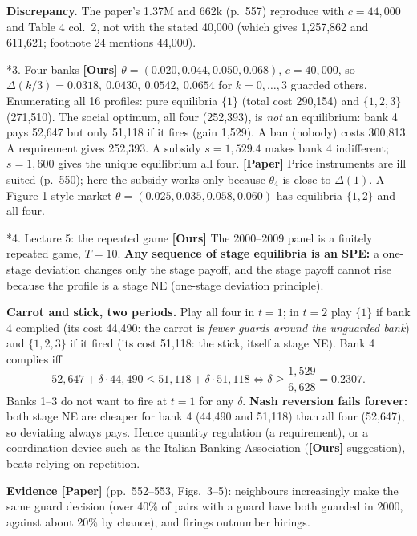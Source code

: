\documentclass[10pt,a4paper]{article}
\makeatletter
\renewcommand\section{\@startsection{section}{1}{\z@}{6pt plus 2pt}{2pt}{\normalfont\large\bfseries}}
\newcommand{\Dl}{\Delta}
\newcommand{\paper}{\textbf{[Paper]}}
\newcommand{\ours}{\textbf{[Ours]}}
\makeatother
\begin{document}
\textbf{Discrepancy.} The paper's 1.37M and 662k (p.\ 557) reproduce with $c=44{,}000$ and Table 4 col.\ 2, not with the stated 40,000
(which gives 1,257,862 and 611,621; footnote 24 mentions 44,000).

\section*{3. Four banks \ours{}}
$\theta=(0.020,0.044,0.050,0.068)$, $c=40{,}000$, so $\Dl(k/3)=0.0318,\ 0.0430,\ 0.0542,\ 0.0654$ for $k=0,\dots,3$ guarded others.
Enumerating all 16 profiles: pure equilibria $\{1\}$ (total cost 290,154) and $\{1,2,3\}$ (271,510). The social optimum, all four
(252,393), is \emph{not} an equilibrium: bank 4 pays 52,647 but only 51,118 if it fires (gain 1,529). A ban (nobody) costs 300,813.
A requirement gives 252,393. A subsidy $s=1{,}529.4$ makes bank 4 indifferent; $s=1{,}600$ gives the unique equilibrium all four.
\paper{} Price instruments are ill suited (p.\ 550); here the subsidy works only because $\theta_4$ is close to $\Dl(1)$.
A Figure 1-style market $\theta=(0.025,0.035,0.058,0.060)$ has equilibria $\{1,2\}$ and all four.

\section*{4. Lecture 5: the repeated game \ours{}}
The 2000--2009 panel is a finitely repeated game, $T=10$. \textbf{Any sequence of stage equilibria is an SPE:} a one-stage deviation changes
only the stage payoff, and the stage payoff cannot rise because the profile is a stage NE (one-stage deviation principle).

\textbf{Carrot and stick, two periods.} Play all four in $t=1$; in $t=2$ play $\{1\}$ if bank 4 complied (its cost 44,490: the carrot is
\emph{fewer guards around the unguarded bank}) and $\{1,2,3\}$ if it fired (its cost 51,118: the stick, itself a stage NE). Bank 4 complies iff
\[
  52{,}647+\delta\cdot44{,}490\le 51{,}118+\delta\cdot51{,}118\iff \delta\ge\frac{1{,}529}{6{,}628}=0.2307 .
\]
Banks 1--3 do not want to fire at $t=1$ for any $\delta$. \textbf{Nash reversion fails forever:} both stage NE are cheaper for bank 4
(44,490 and 51,118) than all four (52,647), so deviating always pays. Hence quantity regulation (a requirement), or a
coordination device such as the Italian Banking Association (\ours{} suggestion), beats relying on repetition.

\textbf{Evidence \paper{}} (pp.\ 552--553, Figs.\ 3--5): neighbours increasingly make the same guard decision (over 40\% of pairs with a
guard have both guarded in 2000, against about 20\% by chance), and firings outnumber hirings.
\end{document}
